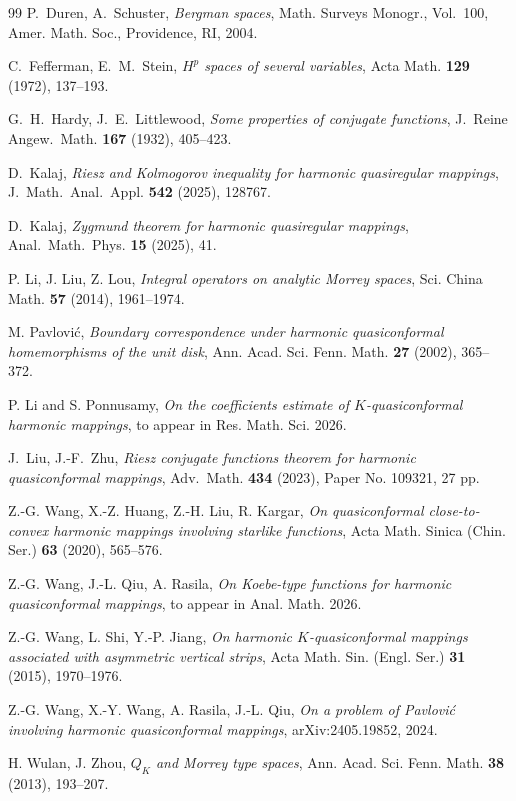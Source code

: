\documentclass[12pt, reqno]{amsart}
\begin{document}
\begin{thebibliography}{99}
P.~Duren, A.~Schuster,
\textit{Bergman spaces},
Math. Surveys Monogr., Vol.~100,
Amer. Math. Soc., Providence, RI, 2004.

C.~Fefferman, E.~M.~Stein,
\textit{$H^p$ spaces of several variables},
Acta Math. \textbf{129} (1972), 137--193.

G.~H.~Hardy, J.~E.~Littlewood,
\textit{Some properties of conjugate functions},
J.~Reine Angew.~Math. \textbf{167} (1932), 405--423.

D.~Kalaj,
\textit{Riesz and Kolmogorov inequality for harmonic quasiregular mappings},
J.~Math.~Anal.~Appl. \textbf{542} (2025), 128767.

D.~Kalaj,
\textit{Zygmund theorem for harmonic quasiregular mappings},
Anal.~Math.~Phys. \textbf{15} (2025), 41.

 P. Li, J. Liu, Z. Lou, 
\textit{Integral operators on analytic Morrey spaces},  
Sci. China Math. \textbf{57} (2014), 1961--1974.

M. Pavlovi\'{c}, \textit{Boundary correspondence under harmonic quasiconformal homemorphisms of the unit disk},
Ann. Acad. Sci. Fenn. Math. \textbf{27} (2002), 365--372. 

P. Li and S. Ponnusamy, \textit{On the coefficients estimate of $K$-quasiconformal harmonic mappings}, to appear in Res. Math. Sci. 2026.

J.~Liu, J.-F.~Zhu,
\textit{Riesz conjugate functions theorem for harmonic quasiconformal mappings},
Adv.~Math. \textbf{434} (2023), Paper No. 109321, 27 pp.

Z.-G. Wang, X.-Z. Huang, Z.-H. Liu, R. Kargar, \textit{On quasiconformal close-to-convex harmonic
mappings involving starlike functions}, Acta Math. Sinica (Chin. Ser.) \textbf{63} (2020), 565--576.


Z.-G. Wang, J.-L. Qiu, A. Rasila, \textit{On Koebe-type functions for harmonic quasiconformal mappings}, to appear in Anal. Math. 2026.

Z.-G. Wang, L. Shi, Y.-P. Jiang, \textit{On harmonic $K$-quasiconformal mappings associated with asymmetric vertical strips}, Acta Math. Sin. (Engl. Ser.) \textbf{31} (2015), 1970--1976.

Z.-G. Wang, X.-Y. Wang, A. Rasila, J.-L. Qiu, \textit{On a problem of Pavlovi\'{c} involving
harmonic quasiconformal mappings}, arXiv:2405.19852, 2024. 

 H. Wulan, J. Zhou, 
\textit{$Q_K$ and Morrey type spaces},
 Ann. Acad. Sci. Fenn. Math. {\bf 38} (2013), 193--207.


\end{thebibliography}
\end{document}
